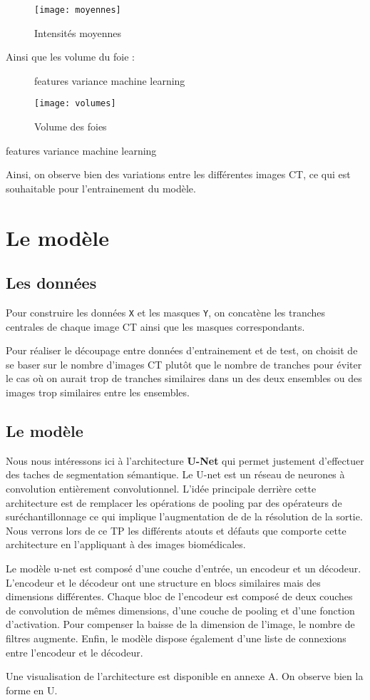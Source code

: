 \documentclass[12pt,a4paper,titlepage]{article}
\begin{document}
\begin{figure}[H]
    \caption{Intensités moyennes}
    \texttt{[image: moyennes]}
    \centering
\end{figure}

Ainsi que les volume du foie :

\begin{figure}[H]features variance machine learning
    \caption{Volume des foies}
    \texttt{[image: volumes]}
    \centering
\end{figure}features variance machine learning

Ainsi, on observe bien des variations entre les différentes images CT, ce
qui est souhaitable pour l'entrainement du modèle.

\section{Le modèle}

\subsection{Les données}

Pour construire les données \texttt{X} et les masques \texttt{Y}, on concatène les
tranches centrales de chaque image CT ainsi que les masques correspondants.

Pour réaliser le découpage entre données d'entrainement et de test,
on choisit de se baser sur le nombre d'images CT plutôt que le nombre
de tranches pour éviter le cas où on aurait trop de tranches similaires
dans un des deux ensembles ou des images trop similaires entre les
ensembles.

\subsection{Le modèle}

Nous nous intéressons ici à l'architecture \textbf{U-Net} qui permet justement d'effectuer
des taches de segmentation sémantique. Le U-net est un réseau de neurones à convolution entièrement
convolutionnel. L'idée principale derrière cette architecture est de remplacer les opérations
de pooling par des opérateurs de suréchantillonnage ce qui implique l'augmentation de de la
résolution de la sortie. Nous verrons lors de ce TP les différents atouts et défauts que comporte
cette architecture en l'appliquant à des images biomédicales.

Le modèle u-net est composé d'une couche d'entrée, un encodeur et un décodeur.
L'encodeur et le décodeur ont une structure en blocs similaires mais des dimensions différentes.
Chaque bloc de l'encodeur est composé de deux couches de convolution de mêmes dimensions,
d'une couche de pooling et d'une fonction d'activation. Pour compenser la baisse de la
dimension de l'image, le nombre de filtres augmente. Enfin, le modèle dispose également d'une
liste de connexions entre l'encodeur et le décodeur.

Une visualisation de l'architecture est disponible en annexe A. On observe bien la forme en U.
\end{document}
